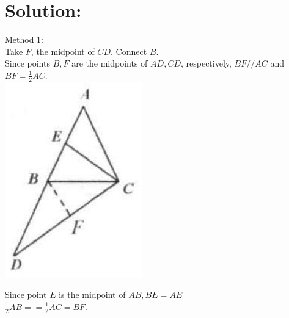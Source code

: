 \documentclass[10pt]{article}
\begin{document}
\section*{Solution:}
Method 1:\\
Take \(F\), the midpoint of \(C D\). Connect \(B\).\\
Since points \(B, F\) are the midpoints of \(A D, C D\), respectively, \(B F / / A C\) and \(B F=\frac{1}{2} A C\).\\
\includegraphics[max width=\textwidth, center]{2025_04_17_97bc1f7e44d93c271a88g-039}

Since point \(E\) is the midpoint of \(A B, B E=A E\)\\
\(\frac{1}{2} A B==\frac{1}{2} A C=B F\).
\end{document}
